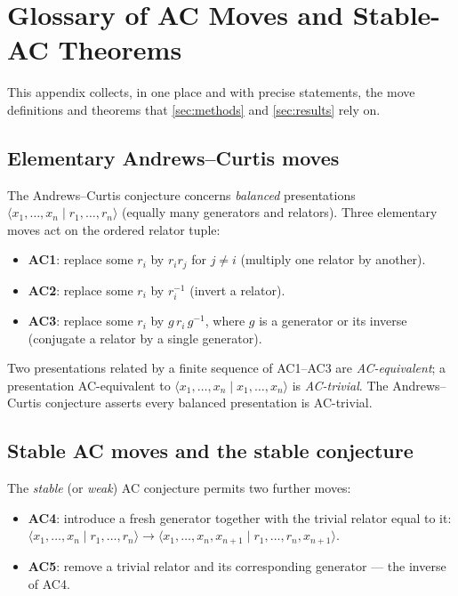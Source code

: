 \section{Glossary of AC Moves and Stable-AC Theorems}\label{app:glossary}

This appendix collects, in one place and with precise statements, the move definitions and
theorems that \ref{sec:methods} and \ref{sec:results} rely on.

\subsection{Elementary Andrews--Curtis moves}

The Andrews--Curtis conjecture \cite{andrews1965ac} concerns \emph{balanced} presentations
$\langle x_1,\dots,x_n \mid r_1,\dots,r_n\rangle$ (equally many generators and relators).
Three elementary moves act on the ordered relator tuple:

\begin{itemize}
  \item \textbf{AC1}: replace some $r_i$ by $r_i r_j$ for $j\neq i$ (multiply one relator by
    another).
  \item \textbf{AC2}: replace some $r_i$ by $r_i^{-1}$ (invert a relator).
  \item \textbf{AC3}: replace some $r_i$ by $g\,r_i\,g^{-1}$, where $g$ is a generator or
    its inverse (conjugate a relator by a single generator).
\end{itemize}

Two presentations related by a finite sequence of AC1--AC3 are \emph{AC-equivalent}; a
presentation AC-equivalent to $\langle x_1,\dots,x_n\mid x_1,\dots,x_n\rangle$ is
\emph{AC-trivial}. The Andrews--Curtis conjecture asserts every balanced presentation is
AC-trivial.

\subsection{Stable AC moves and the stable conjecture}

The \emph{stable} (or \emph{weak}) AC conjecture permits two further moves:

\begin{itemize}
  \item \textbf{AC4}: introduce a fresh generator together with the trivial relator equal
    to it: $\langle x_1,\dots,x_n \mid r_1,\dots,r_n\rangle \to \langle
    x_1,\dots,x_n,x_{n+1} \mid r_1,\dots,r_n,x_{n+1}\rangle$.
  \item \textbf{AC5}: remove a trivial relator and its corresponding generator --- the
    inverse of AC4.
\end{itemize}


